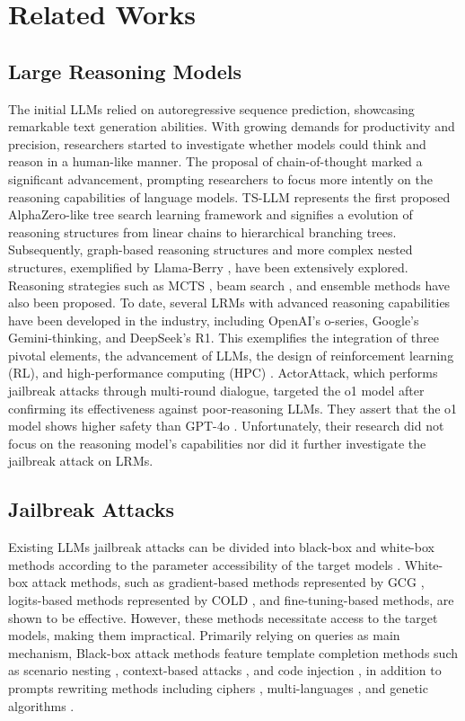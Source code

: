 \section{Related Works}
\subsection{Large Reasoning Models}

The initial LLMs relied on autoregressive sequence prediction, showcasing remarkable text generation abilities. With growing demands for productivity and precision, researchers started to investigate whether models could think and reason in a human-like manner. The proposal of chain-of-thought \citep{cot} marked a significant advancement, prompting researchers to focus more intently on the reasoning capabilities of language models. TS-LLM \citep{treesearch} represents the first proposed AlphaZero-like tree search learning framework and signifies a evolution of reasoning structures from linear chains to hierarchical branching trees. Subsequently, graph-based reasoning structures and more complex nested structures, exemplified by Llama-Berry \citep{llama-berry}, have been extensively explored. Reasoning strategies such as MCTS \citep{mcts}, beam search \citep{beamsearch}, and ensemble methods \citep{selfconsistency, forestofthought} have also been proposed. To date, several LRMs with advanced reasoning capabilities have been developed in the industry, including OpenAI's o-series, Google's Gemini-thinking, and DeepSeek's R1. This exemplifies the integration of three pivotal elements, the advancement of LLMs, the design of reinforcement learning (RL), and high-performance computing (HPC) \citep{llrmblueprint}. ActorAttack, which performs jailbreak attacks through multi-round dialogue, targeted the o1 model after confirming its effectiveness against poor-reasoning LLMs. They assert that the o1 model shows higher safety than GPT-4o \citep{safemtdata}. Unfortunately, their research did not focus on the reasoning model's capabilities nor did it further investigate the jailbreak attack on LRMs.

\subsection{Jailbreak Attacks}

Existing LLMs jailbreak attacks can be divided into black-box and white-box methods according to the parameter accessibility of the target models \citep{jailbreaksurvey, safetysurvey}. White-box attack methods, such as gradient-based methods represented by GCG \citep{advbench}, logits-based methods represented by COLD \citep{cold}, and fine-tuning-based methods, are shown to be effective. However, these methods necessitate access to the target models, making them impractical. Primarily relying on queries as main mechanism, Black-box attack methods feature template completion methods such as scenario nesting \citep{deepinception, wolf}, context-based attacks \citep{ica, mjp}, and code injection \citep{programmatic, codechameleon}, in addition to prompts rewriting methods including ciphers \citep{cipher, artprompt}, multi-languages \citep{multilingual, lowresource}, and genetic algorithms \citep{autodan}.

